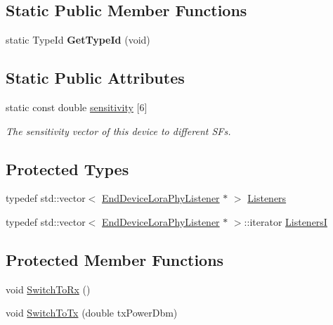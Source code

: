 \subsection*{Static Public Member Functions}
\begin{DoxyCompactItemize}
\item 
\mbox{\label{classns3_1_1lorawan_1_1EndDeviceLoraPhy_ac6c88d25b7e1e8bdd93afecd15224acb}} 
static Type\+Id {\bfseries Get\+Type\+Id} (void)
\end{DoxyCompactItemize}
\subsection*{Static Public Attributes}
\begin{DoxyCompactItemize}
\item 
static const double \hyperlink{classns3_1_1lorawan_1_1EndDeviceLoraPhy_a5fdf969286bc2cd6b357daf10122c759}{sensitivity} \mbox{[}6\mbox{]}
\begin{DoxyCompactList}\small\item\em The sensitivity vector of this device to different S\+Fs. \end{DoxyCompactList}\end{DoxyCompactItemize}
\subsection*{Protected Types}
\begin{DoxyCompactItemize}
\item 
typedef std\+::vector$<$ \hyperlink{classns3_1_1lorawan_1_1EndDeviceLoraPhyListener}{End\+Device\+Lora\+Phy\+Listener} $\ast$ $>$ \hyperlink{classns3_1_1lorawan_1_1EndDeviceLoraPhy_a2d6703f5ff4138f1a45afd26ec6223d9}{Listeners}
\item 
typedef std\+::vector$<$ \hyperlink{classns3_1_1lorawan_1_1EndDeviceLoraPhyListener}{End\+Device\+Lora\+Phy\+Listener} $\ast$ $>$\+::iterator \hyperlink{classns3_1_1lorawan_1_1EndDeviceLoraPhy_add44ac8b9f5035a0171aee9bfa271a9c}{ListenersI}
\end{DoxyCompactItemize}
\subsection*{Protected Member Functions}
\begin{DoxyCompactItemize}
\item 
void \hyperlink{classns3_1_1lorawan_1_1EndDeviceLoraPhy_a8de5dd4978c9ab0525e25991069471cf}{Switch\+To\+Rx} ()
\item 
void \hyperlink{classns3_1_1lorawan_1_1EndDeviceLoraPhy_ac73f67fb873aa6d8f1ee6c2610e6c4a8}{Switch\+To\+Tx} (double tx\+Power\+Dbm)
\end{DoxyCompactItemize}
